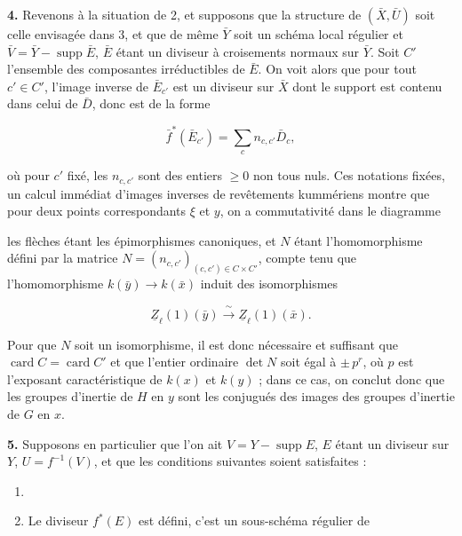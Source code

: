 \documentclass[11pt,a4paper]{article}
\begin{document}

\textbf{4.} Revenons à la situation de 2, et supposons que la structure de
$(\bar{X}, \bar{U})$ soit celle envisagée dans 3, et que de même $\bar{Y}$ soit
un schéma local régulier et $\bar{V} = \bar{Y} - \operatorname{supp} \bar{E}$,
$\bar{E}$ étant un diviseur à croisements normaux sur $\bar{Y}$. Soit $C'$
l'ensemble des composantes irréductibles de $\bar{E}$. On voit alors que pour
tout $c' \in C'$, l'image inverse de $\bar{E}_{c'}$ est un diviseur sur
$\bar{X}$ dont le support est contenu dans celui de $\bar{D}$, donc est de la
forme

\[ \bar{f}^{*}(\bar{E}_{c'}) = \sum_{c} n_{c,c'} \bar{D}_{c}, \]

où pour $c'$ fixé, les $n_{c,c'}$ sont des entiers $\geqslant 0$ non tous nuls.
Ces notations fixées, un calcul immédiat \struck{\ill{}} d'images inverses de
revêtements kummériens montre que pour deux points correspondants $\xi$ et $y$,
\struck{\ill{}} on a commutativité dans le diagramme


les flèches   étant les épimorphismes
canoniques, et $N$ étant l'homomorphisme défini par la matrice $N =
(n_{c,c'})_{(c,c') \in C \times C'}$, compte tenu que l'homomorphisme $k(\bar{y})
\to k(\bar{x})$ induit des isomorphismes

\[ \underline{Z}_{\ell}(1)(\bar{y}) \xrightarrow{\;\sim\;}
\underline{Z}_{\ell}(1)(\bar{x}). \]

Pour que  $N$ soit un isomorphisme, il est donc nécessaire
et suffisant que $\operatorname{card} C = \operatorname{card} C'$ et que
 l'entier ordinaire $\det N$ soit égal à $\pm\, p^{r}$, où $p$
est l'exposant caractéristique de $k(x)$ et $k(y)$ ; dans ce cas, on conclut
donc que les groupes d'inertie de $H$ en $y$ sont les conjugués des
images des groupes d'inertie de $G$ en $x$.

\textbf{5.} Supposons en particulier que l'on ait $V = Y - \operatorname{supp}
E$, $E$ étant un diviseur  sur $Y$,  $U =
f^{-1}(V)$, et que  les conditions suivantes soient satisfaites :

\begin{enumerate}
\item[a)] 
\item[b)] Le diviseur  $f^{*}(E)$ est défini, c'est un sous-schéma
régulier de
\end{enumerate}
\end{document}
